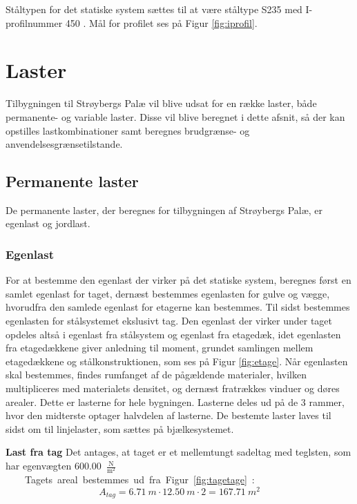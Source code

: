 Ståltypen for det statiske system sættes til at være ståltype S235 med I-profilnummer 450 \citep{stabi}. Mål for profilet ses på Figur \ref{fig:iprofil}. 

\section{Laster}
Tilbygningen til Strøybergs Palæ vil blive udsat for en række laster, både permanente- og variable laster. Disse vil blive beregnet i dette afsnit, så der kan opstilles lastkombinationer samt beregnes brudgrænse- og anvendelsesgrænsetilstande.

\subsection{Permanente laster}
De permanente laster, der beregnes for tilbygningen af Strøybergs Palæ, er egenlast og jordlast.

\subsubsection{Egenlast}
For at bestemme den egenlast der virker på det statiske system, beregnes først en samlet egenlast for taget, dernæst bestemmes egenlasten for gulve og vægge, hvorudfra den samlede egenlast for etagerne kan bestemmes. Til sidst bestemmes egenlasten for stålsystemet ekslusivt tag. Den egenlast der virker under taget opdeles altså i egenlast fra stålsystem og egenlast fra etagedæk, idet egenlasten fra etagedækkene giver anledning til moment, grundet samlingen mellem etagedækkene og stålkonstruktionen, som ses på Figur \ref{fig:etage}. 
\newline \indent{     }  Når egenlasten skal bestemmes, findes rumfanget af de pågældende materialer, hvilken multipliceres med materialets densitet, og dernæst fratrækkes vinduer og døres arealer. Dette er lasterne for hele bygningen. Lasterne deles ud på de 3 rammer, hvor den midterste optager halvdelen af lasterne. De bestemte laster laves til sidst om til linjelaster, som sættes på bjælkesystemet.  

\textbf{Last fra tag}
\newline
Det antages, at taget er et mellemtungt sadeltag med teglsten, som har egenvægten \SI{600,00}{$\frac{\text{N}}{\text{m}^2}$} \citep{tag}.
\newline
\newline
Tagets areal bestemmes ud fra Figur \ref{fig:tagetage}:
\begin{equation}
	A_{tag} = \SI{6,71}{m} \cdot \SI{12,50}{m} \cdot 2 = \SI{167,71}{m^2}
\end{equation}

